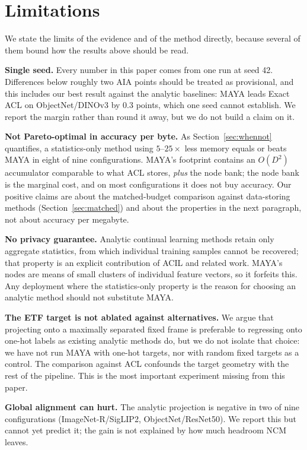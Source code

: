 \section{Limitations}
\label{sec:limitations}

We state the limits of the evidence and of the method directly, because several of them bound how the results above should be read.

\textbf{Single seed.} Every number in this paper comes from one run at seed 42. Differences below roughly two AIA points should be treated as provisional, and this includes our best result against the analytic baselines: MAYA leads Exact ACL on ObjectNet/DINOv3 by $0.3$ points, which one seed cannot establish. We report the margin rather than round it away, but we do not build a claim on it.

\textbf{Not Pareto-optimal in accuracy per byte.} As Section~\ref{sec:whennot} quantifies, a statistics-only method using $5$--$25\times$ less memory equals or beats MAYA in eight of nine configurations. MAYA's footprint contains an $O(D^2)$ accumulator comparable to what ACL stores, \emph{plus} the node bank; the node bank is the marginal cost, and on most configurations it does not buy accuracy. Our positive claims are about the matched-budget comparison against data-storing methods (Section~\ref{sec:matched}) and about the properties in the next paragraph, not about accuracy per megabyte.

\textbf{No privacy guarantee.} Analytic continual learning methods retain only aggregate statistics, from which individual training samples cannot be recovered; that property is an explicit contribution of ACIL and related work. MAYA's nodes are means of small clusters of individual feature vectors, so it forfeits this. Any deployment where the statistics-only property is the reason for choosing an analytic method should not substitute MAYA.

\textbf{The ETF target is not ablated against alternatives.} We argue that projecting onto a maximally separated fixed frame is preferable to regressing onto one-hot labels as existing analytic methods do, but we do not isolate that choice: we have not run MAYA with one-hot targets, nor with random fixed targets as a control. The comparison against ACL confounds the target geometry with the rest of the pipeline. This is the most important experiment missing from this paper.

\textbf{Global alignment can hurt.} The analytic projection is negative in two of nine configurations (ImageNet-R/SigLIP2, ObjectNet/ResNet50). We report this but cannot yet predict it; the gain is not explained by how much headroom NCM leaves.

